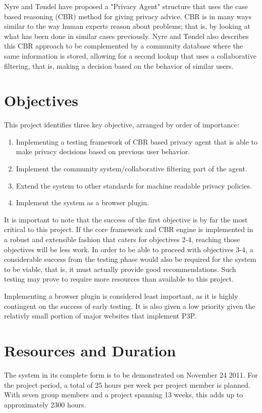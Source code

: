 Nyre and T{\o}ndel have proposed a "Privacy Agent" structure that uses the case based reasoning (CBR) method for giving privacy advice. CBR is in many ways similar to the way human experts reason about problems; that is, by looking at what has been done in similar cases previously. Nyre and T{\o}ndel also describes this CBR approach to be complemented by a community database where the same information is stored, allowing for a second lookup that uses a collaborative filtering, that is, making a decision based on the behavior of similar users. 

\section{Objectives}\label{mandateObjectives}
This project identifies three key objective, arranged by order of importance:

\begin{enumerate}
\item Implementing a testing framework of CBR based privacy agent that is able to make privacy decisions based on previous user behavior.
\item Implement the community system/collaborative filtering part of the agent.
\item Extend the system to other standards for machine readable privacy policies.
\item Implement the system as a browser plugin. 
\end{enumerate}

It is important to note that the success of the first objective is by far the most critical to this project. If the core framework and CBR engine is implemented in a robust and extensible fashion that caters for objectives 2-4, reaching those objectives will be less work. In order to be able to proceed with objectives 3-4, a considerable success from the testing phase would also be required for the system to be viable, that is, it must actually provide good recommendations. Such testing may prove to require more resources than available to this project.

Implementing a browser plugin is considered least important, as it is highly contingent on the success of early testing. It is also given a low priority given the relativly small portion of major websites that implement P3P. 


\section{Resources and Duration}
The system in its complete form is to be demonstrated on November 24 2011. For the project period, a total of 25 hours per week per project member is planned. With seven group members and a project spanning 13 weeks, this adds up to approximately 2300 hours.


